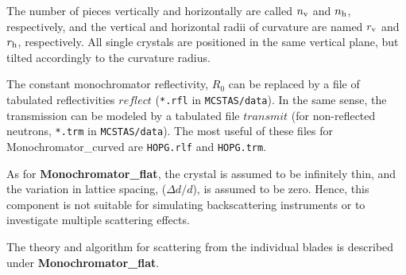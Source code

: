The number of pieces vertically and horizontally are called
$n_{\rm v}$ and $n_{\rm h}$, respectively, and the vertical and horizontal
radii of curvature are named $r_{\rm v}$ and $r_{\rm h}$, respectively.
All single crystals are positioned in the same vertical plane,
but tilted accordingly to the curvature radius.

The constant monochromator reflectivity, $R_0$ can be replaced by
a file of tabulated reflectivities $reflect$ (\verb+*.rfl+ in \verb+MCSTAS/data+). In the same sense, the transmission
can be modeled by a tabulated file $transmit$ (for non-reflected neutrons, \verb+*.trm+ in \verb+MCSTAS/data+).
The most useful of these files for Monochromator\_curved are \verb+HOPG.rlf+ and \verb+HOPG.trm+.

As for {\bf Monochromator\_flat}, the crystal is assumed to be infinitely
thin, and the variation in lattice spacing, ($\Delta d/d$),
is assumed to be zero. Hence, this
component is not suitable for simulating backscattering instruments or to
investigate multiple scattering effects.

The theory and algorithm for scattering from
the individual blades is described under {\bf Monochromator\_flat}.
